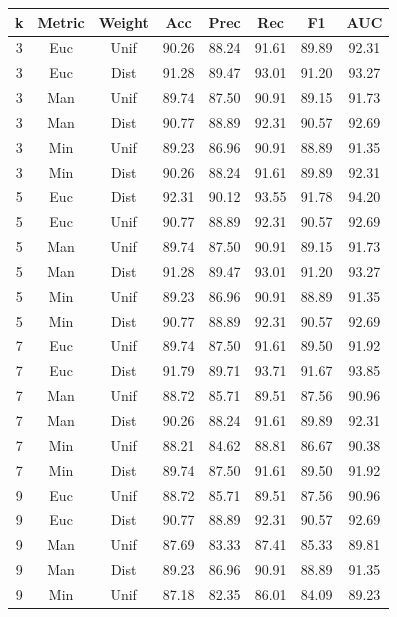 \documentclass[oneside,a4paper,12pt]{report}
\begin{document}
\begin{appendices}
{\small
\begin{longtable}{|c|c|c|c|c|c|c|c|}
\hline
\textbf{k} & \textbf{Metric} & \textbf{Weight} & \textbf{Acc} & \textbf{Prec} & \textbf{Rec} & \textbf{F1} & \textbf{AUC} \\ \hline
\endhead
3 & Euc & Unif & 90.26 & 88.24 & 91.61 & 89.89 & 92.31 \\ \hline
3 & Euc & Dist & 91.28 & 89.47 & 93.01 & 91.20 & 93.27 \\ \hline
3 & Man & Unif & 89.74 & 87.50 & 90.91 & 89.15 & 91.73 \\ \hline
3 & Man & Dist & 90.77 & 88.89 & 92.31 & 90.57 & 92.69 \\ \hline
3 & Min & Unif & 89.23 & 86.96 & 90.91 & 88.89 & 91.35 \\ \hline
3 & Min & Dist & 90.26 & 88.24 & 91.61 & 89.89 & 92.31 \\ \hline
5 & Euc & Dist & 92.31 & 90.12 & 93.55 & 91.78 & 94.20 \\ \hline
5 & Euc & Unif & 90.77 & 88.89 & 92.31 & 90.57 & 92.69 \\ \hline
5 & Man & Unif & 89.74 & 87.50 & 90.91 & 89.15 & 91.73 \\ \hline
5 & Man & Dist & 91.28 & 89.47 & 93.01 & 91.20 & 93.27 \\ \hline
5 & Min & Unif & 89.23 & 86.96 & 90.91 & 88.89 & 91.35 \\ \hline
5 & Min & Dist & 90.77 & 88.89 & 92.31 & 90.57 & 92.69 \\ \hline
7 & Euc & Unif & 89.74 & 87.50 & 91.61 & 89.50 & 91.92 \\ \hline
7 & Euc & Dist & 91.79 & 89.71 & 93.71 & 91.67 & 93.85 \\ \hline
7 & Man & Unif & 88.72 & 85.71 & 89.51 & 87.56 & 90.96 \\ \hline
7 & Man & Dist & 90.26 & 88.24 & 91.61 & 89.89 & 92.31 \\ \hline
7 & Min & Unif & 88.21 & 84.62 & 88.81 & 86.67 & 90.38 \\ \hline
7 & Min & Dist & 89.74 & 87.50 & 91.61 & 89.50 & 91.92 \\ \hline
9 & Euc & Unif & 88.72 & 85.71 & 89.51 & 87.56 & 90.96 \\ \hline
9 & Euc & Dist & 90.77 & 88.89 & 92.31 & 90.57 & 92.69 \\ \hline
9 & Man & Unif & 87.69 & 83.33 & 87.41 & 85.33 & 89.81 \\ \hline
9 & Man & Dist & 89.23 & 86.96 & 90.91 & 88.89 & 91.35 \\ \hline
9 & Min & Unif & 87.18 & 82.35 & 86.01 & 84.09 & 89.23 \\ \hline

\end{longtable}}
\end{appendices}
\end{document}
